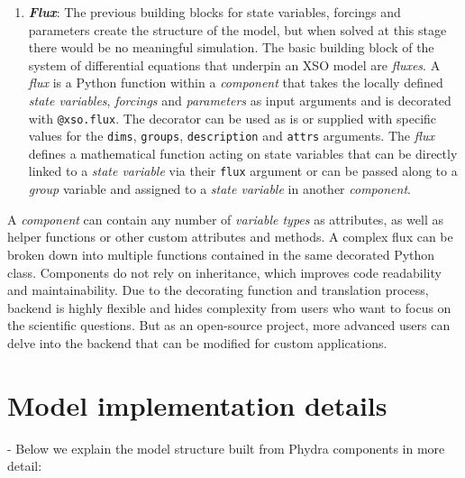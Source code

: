 \documentclass[journal abbreviation, manuscript]{copernicus}
\begin{document}
\begin{enumerate}
    \item \textbf{\textit{Flux}}: 
    The previous building blocks for state variables, forcings and parameters create the structure of the model, but when solved at this stage there would be no meaningful simulation. The basic building block of the system of differential equations that underpin an XSO model are \textit{fluxes}. A \textit{flux} is a Python function within a \textit{component} that takes the locally defined \textit{state variables}, \textit{forcings} and \textit{parameters} as input arguments and is decorated with \texttt{@xso.flux}. The decorator can be used as is or supplied with specific values for the \texttt{dims}, \texttt{groups}, \texttt{description} and \texttt{attrs} arguments. The \textit{flux} defines a mathematical function acting on state variables that can be directly linked to a \textit{state variable} via their \texttt{flux} argument or can be passed along to a \textit{group} variable and assigned to a \textit{state variable} in another \textit{component}.

    
\end{enumerate}

A \textit{component} can contain any number of \textit{variable types} as attributes, as well as helper functions or other custom attributes and methods. A complex flux can be broken down into multiple functions contained in the same decorated Python class. Components do not rely on inheritance, which improves code readability and maintainability. Due to the decorating function and translation process, backend is highly flexible and hides complexity from users who want to focus on the scientific questions. But as an open-source project, more advanced users can delve into the backend that can be modified for custom applications.


\section{Model implementation details}
- Below we explain the model structure built from Phydra components in more detail:
\end{document}
